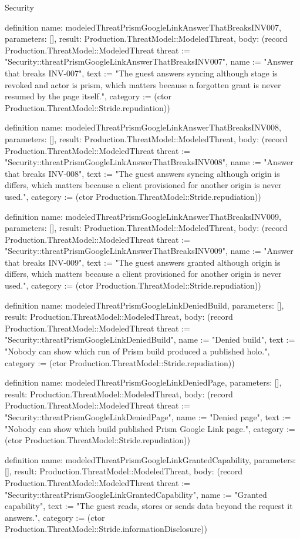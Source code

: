 \begin{lexlean}{Security}
\begin{semanticmodule}
definition{
  name: modeledThreatPrismGoogleLinkAnswerThatBreaksINV007,
  parameters: [],
  result: Production.ThreatModel::ModeledThreat,
  body: (record Production.ThreatModel::ModeledThreat {threat := "Security::threatPrismGoogleLinkAnswerThatBreaksINV007", name := "Answer that breaks INV-007", text := "The guest answers syncing although stage is revoked and actor is prism, which matters because a forgotten grant is never resumed by the page itself.", category := (ctor Production.ThreatModel::Stride.repudiation)})
}

definition{
  name: modeledThreatPrismGoogleLinkAnswerThatBreaksINV008,
  parameters: [],
  result: Production.ThreatModel::ModeledThreat,
  body: (record Production.ThreatModel::ModeledThreat {threat := "Security::threatPrismGoogleLinkAnswerThatBreaksINV008", name := "Answer that breaks INV-008", text := "The guest answers syncing although origin is differs, which matters because a client provisioned for another origin is never used.", category := (ctor Production.ThreatModel::Stride.repudiation)})
}

definition{
  name: modeledThreatPrismGoogleLinkAnswerThatBreaksINV009,
  parameters: [],
  result: Production.ThreatModel::ModeledThreat,
  body: (record Production.ThreatModel::ModeledThreat {threat := "Security::threatPrismGoogleLinkAnswerThatBreaksINV009", name := "Answer that breaks INV-009", text := "The guest answers granted although origin is differs, which matters because a client provisioned for another origin is never used.", category := (ctor Production.ThreatModel::Stride.repudiation)})
}

definition{
  name: modeledThreatPrismGoogleLinkDeniedBuild,
  parameters: [],
  result: Production.ThreatModel::ModeledThreat,
  body: (record Production.ThreatModel::ModeledThreat {threat := "Security::threatPrismGoogleLinkDeniedBuild", name := "Denied build", text := "Nobody can show which run of Prism build produced a published holo.", category := (ctor Production.ThreatModel::Stride.repudiation)})
}

definition{
  name: modeledThreatPrismGoogleLinkDeniedPage,
  parameters: [],
  result: Production.ThreatModel::ModeledThreat,
  body: (record Production.ThreatModel::ModeledThreat {threat := "Security::threatPrismGoogleLinkDeniedPage", name := "Denied page", text := "Nobody can show which build published Prism Google Link page.", category := (ctor Production.ThreatModel::Stride.repudiation)})
}

definition{
  name: modeledThreatPrismGoogleLinkGrantedCapability,
  parameters: [],
  result: Production.ThreatModel::ModeledThreat,
  body: (record Production.ThreatModel::ModeledThreat {threat := "Security::threatPrismGoogleLinkGrantedCapability", name := "Granted capability", text := "The guest reads, stores or sends data beyond the request it answers.", category := (ctor Production.ThreatModel::Stride.informationDisclosure)})
}


\end{semanticmodule}
\end{lexlean}
